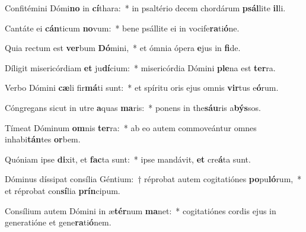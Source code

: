 \item Confitémini Dómi\textbf{no} in \textbf{cí}thara:~* in psaltério decem chordárum \textbf{psál}lite \textbf{il}li.
\item Cantáte ei \textbf{cán}ticum \textbf{no}vum:~* bene psállite ei in vocife\textbf{ra}ti\textbf{ó}ne.
\item Quia rectum est \textbf{ver}bum \textbf{Dó}mini,~* et ómnia ópera \textbf{e}jus in \textbf{fi}de.
\item Díligit misericórdiam \textbf{et} ju\textbf{dí}cium:~* misericórdia Dómini \textbf{ple}na est \textbf{ter}ra.
\item Verbo Dómini \textbf{cæ}li fir\textbf{má}ti sunt:~* et spíritu oris ejus omnis \textbf{vir}tus e\textbf{ó}rum.
\item Cóngregans sicut in utre \textbf{a}quas \textbf{ma}ris:~* ponens in the\textbf{sáu}ris a\textbf{býs}sos.
\item Tímeat Dóminum \textbf{om}nis \textbf{ter}ra:~* ab eo autem commoveántur omnes inhabi\textbf{tán}tes \textbf{or}bem.
\item Quóniam ipse \textbf{di}xit, et \textbf{fac}ta sunt:~* ipse mandávit, \textbf{et} cre\textbf{á}ta sunt.
\item Dóminus díssipat consília Géntium:~† réprobat autem cogitatiónes \textbf{po}pu\textbf{ló}rum,~* et réprobat con\textbf{sí}lia \textbf{prín}cipum.
\item Consílium autem Dómini in æ\textbf{tér}num \textbf{ma}net:~* cogitatiónes cordis ejus in generatióne et gene\textbf{ra}ti\textbf{ó}nem.
